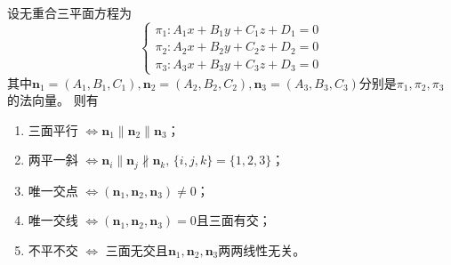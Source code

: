 设无重合三平面方程为
\[
    \begin{cases}
        \pi_1 : A_1x+B_1y+C_1z+D_1=0 \\
        \pi_2 : A_2x+B_2y+C_2z+D_2=0 \\
        \pi_3 : A_3x+B_3y+C_3z+D_3=0
    \end{cases}
\]
其中$\bm{n}_1=(A_1,B_1,C_1),\bm{n}_2=(A_2,B_2,C_2),\bm{n}_3=(A_3,B_3,C_3)$分别是$\pi_1,\pi_2,\pi_3$的法向量。
则有
\begin{enumerate}[(1)]
    \item 三面平行 $\iff \bm{n}_1\parallel\bm{n}_2\parallel\bm{n}_3$；
    \item 两平一斜 $\iff \bm{n}_i\parallel\bm{n}_j\nparallel\bm{n}_k,\,\{i,j,k\}=\{1,2,3\}$；
    \item 唯一交点 $\iff (\bm{n}_1,\bm{n}_2,\bm{n}_3) \neq 0$；
    \item 唯一交线 $\iff (\bm{n}_1,\bm{n}_2,\bm{n}_3)=0$且三面有交；
    \item 不平不交 $\iff$ 三面无交且$\bm{n}_1,\bm{n}_2,\bm{n}_3$两两线性无关。
\end{enumerate}
